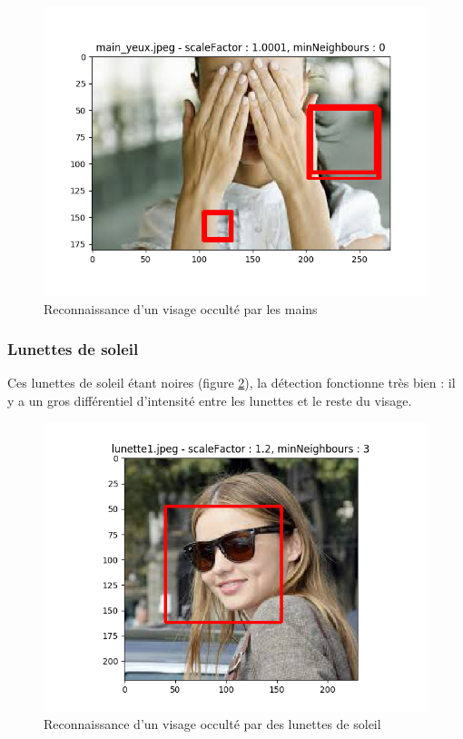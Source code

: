 \documentclass[a4paper,11pt]{article}
\begin{document}
	    \begin{figure}[H]
	        \begin{center}
		   \includegraphics[scale = 0.6]{images/main_yeux_1,0001_0.png}
		   \caption{Reconnaissance d'un visage occulté par les mains}
		   \label{fig:mains}
	        \end{center}
	    \end{figure}

	\subsubsection{Lunettes de soleil}

	    Ces lunettes de soleil étant noires (figure \ref{fig:lunette}), la détection fonctionne
	    très bien : il y a un gros
	    différentiel d'intensité entre les lunettes et le reste du visage.

	    \begin{figure}[H]
	        \begin{center}
		   \includegraphics[scale = 0.6]{images/lunette1_1,2_3.png}
		   \caption{Reconnaissance d'un visage occulté par des lunettes de soleil}
		   \label{fig:lunette}
	        \end{center}
	    \end{figure}
	
\end{document}
